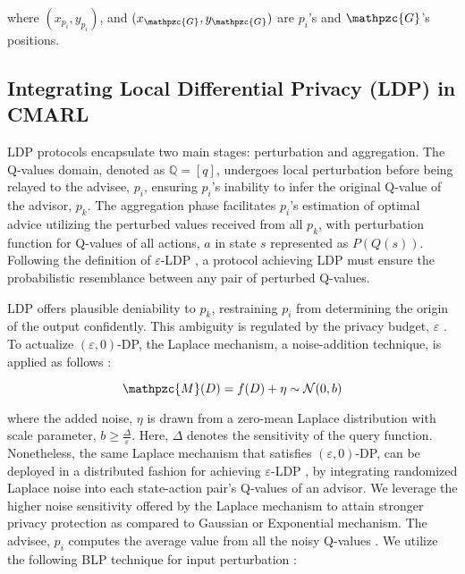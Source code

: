 where $(x_{p_i}, y_{p_i})$, and $(x_{\mathpzc{G}}, y_{\mathpzc{G}})$ are $p_i$'s and $\mathpzc{G}$'s positions.

\subsection{Integrating Local Differential Privacy (LDP) in CMARL}
LDP protocols encapsulate two main stages: perturbation and aggregation. The Q-values domain, denoted as $\mathbb{Q} = \left[q\right]$, undergoes local perturbation before being relayed to the advisee, $p_i$, ensuring $p_i$'s inability to infer the original Q-value of the advisor, $p_k$. The aggregation phase facilitates $p_i$'s estimation of optimal advice utilizing the perturbed values received from all $p_k$, with perturbation function for Q-values of all actions, $a$ in state $s$ represented as $P(Q(s))$. Following the definition of $\varepsilon$-LDP \cite{cao2021data}, a protocol achieving LDP must ensure the probabilistic resemblance between any pair of perturbed Q-values.

LDP offers plausible deniability to $p_k$, restraining $p_i$ from determining the origin of the output confidently. This ambiguity is regulated by the privacy budget, $\varepsilon$ \cite{dwork2006}. To actualize $(\varepsilon, 0)$-DP, the Laplace mechanism, a noise-addition technique, is applied as follows \cite{dwork2006}:

\begin{equation}
    \mathpzc{M}(D) = f(D) + \eta \sim \mathcal{N}(0, b)
\end{equation}

where the added
noise, $\eta$ is drawn from a zero-mean Laplace distribution with
scale parameter, $b \geq \frac{\Delta}{\varepsilon}$. Here, $\Delta$ denotes the sensitivity of the query function. Nonetheless, the same Laplace mechanism that satisfies $(\varepsilon,0)$-DP,  can be deployed in a distributed fashion for achieving $\varepsilon$-LDP \cite{wang2020comprehensive, Neera2023}, by integrating randomized Laplace noise into each state-action pair's Q-values of an advisor. We leverage the higher noise sensitivity offered by the Laplace mechanism to attain stronger privacy protection as compared to Gaussian or Exponential mechanism. The advisee, $p_i$ computes the average value from all the noisy Q-values \cite{wang2020comprehensive}. We utilize the following BLP technique for input perturbation \cite{Neera2023}: 

